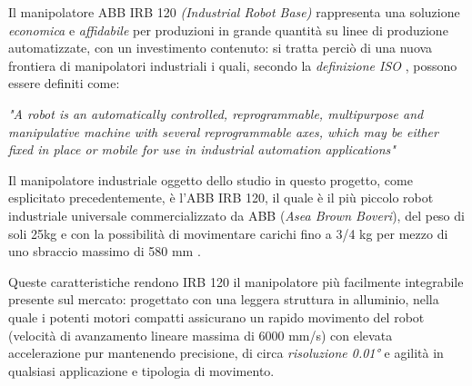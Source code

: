 Il manipolatore ABB IRB 120 \emph{(Industrial Robot Base)} rappresenta una soluzione \emph{economica} e \emph{affidabile} per produzioni in grande quantità su linee di produzione automatizzate, con un investimento contenuto: si tratta perciò di una nuova frontiera di manipolatori industriali i quali, secondo la \emph{definizione \textsc{ISO}} \cite{ISO:normaRobot}, possono essere definiti come:
\begin{quoting}

\emph{"A robot is an automatically controlled, reprogrammable, multipurpose and manipulative machine with
	several reprogrammable axes, which may be either fixed in place or mobile for use in
	industrial automation applications"}
\end{quoting}

Il manipolatore industriale oggetto dello studio in questo progetto, come esplicitato precedentemente, è l'ABB IRB 120, il quale è il più piccolo robot industriale universale commercializzato da ABB (\emph{Asea Brown Boveri}), del peso di soli 25kg e con la possibilità di movimentare carichi fino a 3/4 kg per mezzo di uno sbraccio massimo di 580 \si{\milli\metre} \cite{ABB:Manul_irb120}.

Queste caratteristiche rendono IRB 120 il manipolatore più facilmente integrabile presente sul mercato: progettato con una leggera struttura in alluminio, nella quale i potenti motori compatti assicurano un rapido movimento del robot (velocità di avanzamento lineare massima di 6000 \si{\milli\metre}/\si{\second}) con elevata accelerazione pur mantenendo precisione, di circa \emph{risoluzione \ang{0.01}} e agilità in qualsiasi applicazione e tipologia di movimento.
 
\newpage
